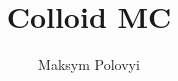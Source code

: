 \documentclass[12pt,a4paper]{article}
\author{Maksym Polovyi}
\title{Colloid MC}
\begin{document}




\newpage


\newpage


\cite{Camp2000}



\end{document}

